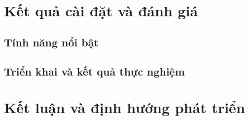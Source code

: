 \documentclass[12pt,a4paper]{report}
\begin{document}
\chapter{Kết quả cài đặt và đánh giá}

\section{Tính năng nổi bật}


% 

% 

\section{Triển khai và kết quả thực nghiệm}


\chapter{Kết luận và định hướng phát triển}


\nocite{*}
\printbibliography[heading=bibintoc, title=Tài liệu tham khảo]



\end{document}
